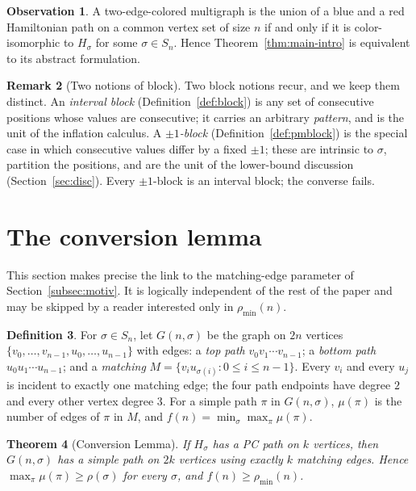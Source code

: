 \documentclass[11pt]{article}
\newtheorem{theorem}{Theorem}[section]
\theoremstyle{definition}
\newtheorem{definition}[theorem]{Definition}
\newtheorem{remark}[theorem]{Remark}
\newtheorem{observation}[theorem]{Observation}
\newcommand{\pmin}{\rho_{\min}}
\begin{document}
\begin{observation}\label{obs:translate}
A two-edge-colored multigraph is the union of a blue and a red Hamiltonian path on a
common vertex set of size $n$ if and only if it is color-isomorphic to $H_\sigma$ for
some $\sigma \in S_n$. Hence Theorem~\ref{thm:main-intro} is equivalent to its
abstract formulation.
\end{observation}

\begin{remark}[Two notions of block]\label{rem:blocks}
Two block notions recur, and we keep them distinct. An \emph{interval block}
(Definition~\ref{def:block}) is any set of consecutive positions whose values are
consecutive; it carries an arbitrary \emph{pattern}, and is the unit of the inflation
calculus. A \emph{$\pm1$-block} (Definition~\ref{def:pmblock}) is the special case in
which consecutive values differ by a fixed $\pm1$; these are intrinsic to $\sigma$,
partition the positions, and are the unit of the lower-bound discussion
(Section~\ref{sec:disc}). Every $\pm1$-block is an interval block; the converse fails.
\end{remark}

\section{The conversion lemma}\label{sec:conversion}

This section makes precise the link to the matching-edge parameter of
Section~\ref{subsec:motiv}. It is logically independent of the rest of the paper and
may be skipped by a reader interested only in $\pmin(n)$.

\begin{definition}\label{def:Gns}
For $\sigma \in S_n$, let $G(n,\sigma)$ be the graph on $2n$ vertices
$\{v_0,\dots,v_{n-1},u_0,\dots,u_{n-1}\}$ with edges:
a \emph{top path} $v_0 v_1 \cdots v_{n-1}$; a \emph{bottom path}
$u_0 u_1 \cdots u_{n-1}$; and a \emph{matching} $M = \{v_i u_{\sigma(i)} : 0\le i\le
n-1\}$. Every $v_i$ and every $u_j$ is incident to exactly one matching edge; the four
path endpoints have degree $2$ and every other vertex degree $3$. For a simple path
$\pi$ in $G(n,\sigma)$, $\mu(\pi)$ is the number of edges of $\pi$ in $M$, and
$f(n) = \min_\sigma \max_\pi \mu(\pi)$.
\end{definition}

\begin{theorem}[Conversion Lemma]\label{thm:conversion}
If $H_\sigma$ has a PC path on $k$ vertices, then $G(n,\sigma)$ has a simple path on
$2k$ vertices using exactly $k$ matching edges. Hence $\max_\pi \mu(\pi) \ge
\rho(\sigma)$ for every $\sigma$, and $f(n) \ge \pmin(n)$.
\end{theorem}
\end{document}
